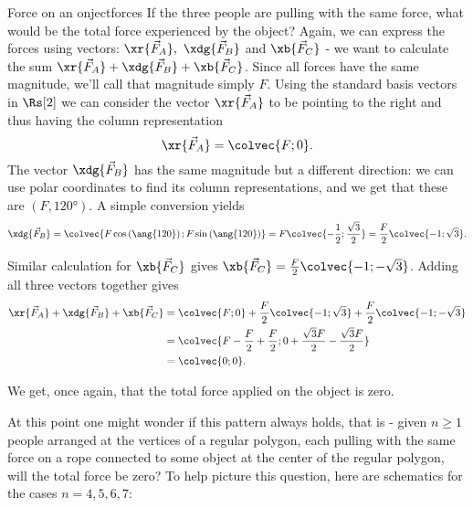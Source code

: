 \begin{example}{Force on an onject}{forces}
  If the three people are pulling with the same force, what would be the total force experienced by the object? Again, we can express the forces using vectors: $\xr{\vec{F}_{A}},\ \xdg{\vec{F}_{B}}$ and $\xb{\vec{F}_{C}}$ - we want to calculate the sum $\xr{\vec{F}_{A}}+\xdg{\vec{F}_{B}}+\xb{\vec{F}_{C}}$. Since all forces have the same magnitude, we'll call that magnitude simply $F$. Using the standard basis vectors in $\Rs[2]$ we can consider the vector $\xr{\vec{F}_{A}}$ to be pointing to the right and thus having the column representation
  \[
    \xr{\vec{F}_{A}} = \colvec{F;0}.
  \]
  The vector $\xdg{\vec{F}_{B}}$ has the same magnitude but a different direction: we can use polar coordinates to find its column representations, and we get that these are $(F,\ang{120})$. A simple conversion yields
  \[
    \xdg{\vec{F}_{B}} = \colvec{F\cos\left(\ang{120}\right);F\sin\left(\ang{120}\right)} = F\colvec{-\frac{1}{2};\frac{\sqrt{3}}{2}} = \frac{F}{2}\colvec{-1;\sqrt{3}}.
  \]

  Similar calculation for $\xb{\vec{F}_{C}}$ gives $\xb{\vec{F}_{C}}=\frac{F}{2}\colvec{-1;-\sqrt{3}}$. Adding all three vectors together gives
  \begin{align*}
    \xr{\vec{F}_{A}}+\xdg{\vec{F}_{B}}+\xb{\vec{F}_{C}} &= \colvec{F;0} + \frac{F}{2}\colvec{-1;\sqrt{3}} + \frac{F}{2}\colvec{-1;-\sqrt{3}}\\
                                                        &= \colvec{F-\frac{F}{2}+\frac{F}{2};0+\frac{\sqrt{3}F}{2}-\frac{\sqrt{3}F}{2}}\\
                                                        &= \colvec{0;0}.
  \end{align*}

  We get, once again, that the total force applied on the object is zero.

  At this point one might wonder if this pattern always holds, that is - given $n\geq1$ people arranged at the vertices of a regular polygon, each pulling with the same force on a rope connected to some object at the center of the regular polygon, will the total force be zero? To help picture this question, here are schematics for the cases $n=4,5,6,7$:


\end{example}
